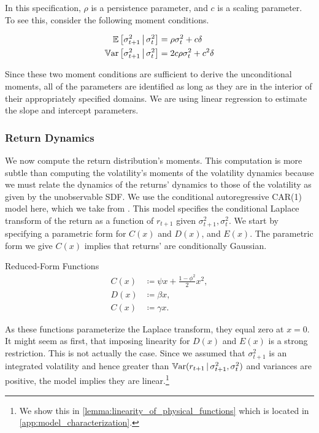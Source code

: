 \documentclass[11pt, letterpaper, twoside]{article}
\begin{document}
In this specification, $\rho$ is a persistence parameter, and $c$ is a scaling parameter. To see this, consider the following moment conditions. 

\begin{remark} 
 \label{remark:vol_moment_conditions}
 \begin{align}
  \E\left[\sigma^2_{t+1} \mvert \sigma^2_t \right] &= \rho \sigma^2_t + c \delta\\
%
  \Var\left[\sigma^2_{t+1} \mvert \sigma^2_t \right] &= 2 c \rho \sigma^2_t + c^2
  \delta 
%
 \end{align}
\end{remark}

Since these two moment conditions are sufficient to derive the unconditional moments, all of the parameters are identified as long as they are in the interior of their appropriately specified domains. We are using linear regression to estimate the slope and intercept parameters.

\subsubsection{Return Dynamics}

We now compute the return distribution's moments. This computation is more subtle than computing the volatility's moments of the volatility dynamics because we must relate the dynamics of the returns' dynamics to those of the volatility as given by the unobservable SDF.  We use the conditional autoregressive CAR(1) model here, which we take from \textcite{darolles2006structural,han2018leverage}. This model specifies the conditional Laplace transform of the return as a function of $r_{t+1}$ given $\sigma^2_{t+1}, \sigma^2_t$. We start by specifying a parametric form for $C(x)$ and $D(x)$, and $E(x)$. The parametric form we give   $C(x)$ implies that returns'  are conditionally Gaussian.


\begin{defn}{Reduced-Form Functions}
 \label{defn:physical_return_dynamics}
 \begin{align}
  C(x) &\coloneqq \psi x + \frac{1 - \phi^2}{2} x^2, \\
  D(x) &\coloneqq \beta x, \\
  C(x) &\coloneqq \gamma x. 
 \end{align}
\end{defn}

As these functions parameterize the Laplace transform, they equal zero at $x=0$. It might seem as first, that imposing linearity for $D(x)$ and $E(x)$ is a strong restriction. This is not actually the case. Since we assumed that $\sigma^2_{t+1}$ is an integrated volatility and hence greater than $\operatorname{\mathbb{V}ar}(r_{t+1} \,\vert\, \sigma^2_{t+1}, \sigma^2_{t})$ and variances are positive, the model implies they are linear.\footnote{We show this in \cref{lemma:linearity_of_physical_functions} which is located in \cref{app:model_characterization}.}
\end{document}
